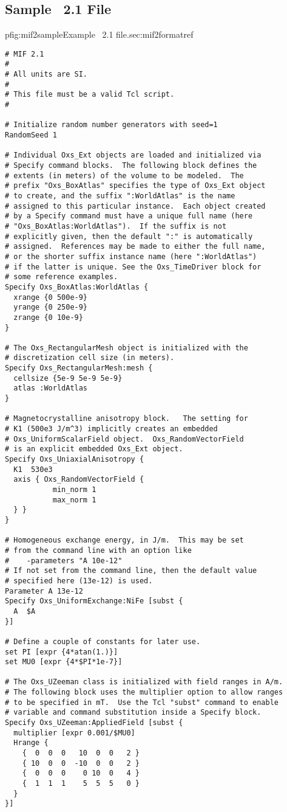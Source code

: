 \subsection{Sample \MIF~2.1 File}\label{sec:mif2sample}
\begin{codelisting}{p}{fig:mif2sample}{Example \MIF~2.1
   file.}{sec:mif2format}{ref}
\begin{verbatim}
# MIF 2.1
#
# All units are SI.
#
# This file must be a valid Tcl script.
#

# Initialize random number generators with seed=1
RandomSeed 1

# Individual Oxs_Ext objects are loaded and initialized via
# Specify command blocks.  The following block defines the
# extents (in meters) of the volume to be modeled.  The
# prefix "Oxs_BoxAtlas" specifies the type of Oxs_Ext object
# to create, and the suffix ":WorldAtlas" is the name
# assigned to this particular instance.  Each object created
# by a Specify command must have a unique full name (here
# "Oxs_BoxAtlas:WorldAtlas").  If the suffix is not
# explicitly given, then the default ":" is automatically
# assigned.  References may be made to either the full name,
# or the shorter suffix instance name (here ":WorldAtlas")
# if the latter is unique. See the Oxs_TimeDriver block for
# some reference examples.
Specify Oxs_BoxAtlas:WorldAtlas {
  xrange {0 500e-9}
  yrange {0 250e-9}
  zrange {0 10e-9}
}

# The Oxs_RectangularMesh object is initialized with the
# discretization cell size (in meters).
Specify Oxs_RectangularMesh:mesh {
  cellsize {5e-9 5e-9 5e-9}
  atlas :WorldAtlas
}

# Magnetocrystalline anisotropy block.   The setting for
# K1 (500e3 J/m^3) implicitly creates an embedded
# Oxs_UniformScalarField object.  Oxs_RandomVectorField
# is an explicit embedded Oxs_Ext object.
Specify Oxs_UniaxialAnisotropy {
  K1  530e3
  axis { Oxs_RandomVectorField {
           min_norm 1
           max_norm 1
  } }
}

# Homogeneous exchange energy, in J/m.  This may be set
# from the command line with an option like
#    -parameters "A 10e-12"
# If not set from the command line, then the default value
# specified here (13e-12) is used.
Parameter A 13e-12
Specify Oxs_UniformExchange:NiFe [subst {
  A  $A
}]

# Define a couple of constants for later use.
set PI [expr {4*atan(1.)}]
set MU0 [expr {4*$PI*1e-7}]

# The Oxs_UZeeman class is initialized with field ranges in A/m.
# The following block uses the multiplier option to allow ranges
# to be specified in mT.  Use the Tcl "subst" command to enable
# variable and command substitution inside a Specify block.
Specify Oxs_UZeeman:AppliedField [subst {
  multiplier [expr 0.001/$MU0]
  Hrange {
    {  0  0  0   10  0  0   2 }
    { 10  0  0  -10  0  0   2 }
    {  0  0  0    0 10  0   4 }
    {  1  1  1    5  5  5   0 }
  }
}]


\end{verbatim}
\end{codelisting}

